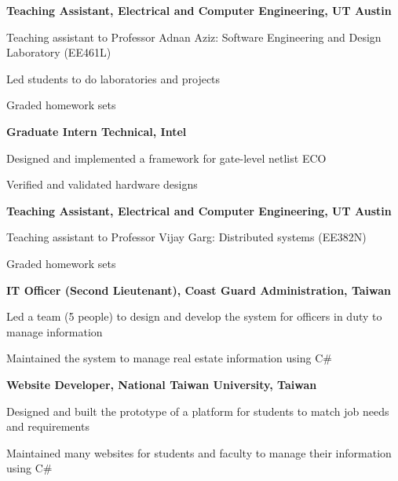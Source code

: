 


\begin{myexp}
    \item \textbf{Teaching Assistant, Electrical and Computer Engineering, UT
        Austin}   
  \begin{mybullet}
  	\item Teaching assistant to Professor Adnan Aziz: Software Engineering
  	    and Design Laboratory (EE461L) 
        \item Led students to do laboratories and projects
	\item Graded homework sets
  \end{mybullet}
    \item \textbf{Graduate Intern Technical, Intel}   
  \begin{mybullet}
  	\item Designed and implemented a framework for gate-level netlist ECO
	\item Verified and validated hardware designs
  \end{mybullet}
    \item \textbf{Teaching Assistant, Electrical and Computer Engineering, UT Austin}   
  \begin{mybullet}
  	\item Teaching assistant to Professor Vijay Garg: Distributed systems (EE382N) 
	\item Graded homework sets
  \end{mybullet}
   \item \textbf{IT Officer (Second Lieutenant), Coast Guard Administration, Taiwan }   
      \begin{mybullet}
      \item Led a team (5 people) to design and develop the system for officers in duty to manage information
      \item Maintained the system to manage real estate information using C\#
   \end{mybullet}
   \item \textbf{Website Developer, National Taiwan University, Taiwan}  
   \begin{mybullet}
      \item Designed and built the prototype of a platform for students to match job needs and requirements
      \item Maintained many websites for students and faculty to manage their information using C\#
   \end{mybullet}
\end{myexp}
